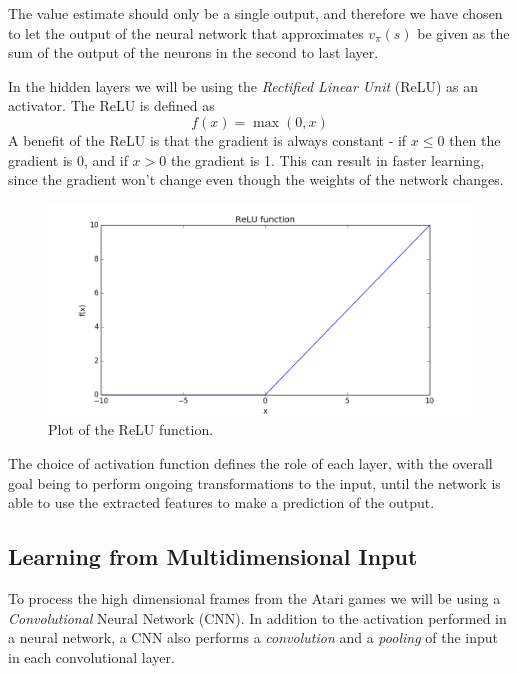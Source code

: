 \documentclass[11pt]{article}
\begin{document}
The value estimate should only be a single output, and therefore we have chosen to
let the output of the neural network that approximates $v_\pi(s)$ be given
as the sum of the output of the neurons in the second to last layer.

In the hidden layers we will be using the \textit{Rectified
Linear Unit} (ReLU) as an activator.
The ReLU is defined as
\begin{equation}
    f(x) = \max(0,x)
\end{equation}
A benefit of the ReLU is that the gradient is always constant - 
if $x \leq 0$ then the gradient is 0, and if $x > 0$ the gradient is 1.
This can result in faster learning, since the gradient won't change even
though the weights of the network changes.
\begin{figure}[!h]
    \centering
    \includegraphics[width=15cm]{include/relu.png}
    \caption{Plot of the ReLU function.}
    \label{fig:relu}
\end{figure}

The choice of activation function defines the role of each layer,
with the overall goal being to perform ongoing transformations
to the input, until the network is able to use the extracted
features to make a prediction of the output.

\subsection{Learning from Multidimensional Input}

To process the high dimensional frames from the Atari games we will be using
a \textit{Convolutional} Neural Network (CNN).
In addition to the activation performed in a neural network, a CNN
also performs a \textit{convolution} and a \textit{pooling} of the input in each convolutional layer.
\end{document}
